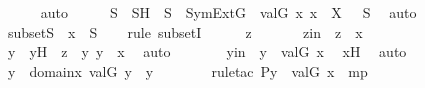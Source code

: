 \begin{isabellebody}
\ \ \ \ \isamarkupfalse%
\ auto\isanewline
\ \ \isamarkupfalse%
\ \isamarkupfalse%
\ S\ \ SH\ {\isacharcolon}{\kern0pt}\ {\isachardoublequoteopen}S\ {\isasymin}\ SymExt{\isacharparenleft}{\kern0pt}G{\isacharparenright}{\kern0pt}{\isachardoublequoteclose}\ {\isachardoublequoteopen}{\isacharbraceleft}{\kern0pt}\ val{\isacharparenleft}{\kern0pt}G{\isacharcomma}{\kern0pt}\ x{\isacharparenright}{\kern0pt}{\isachardot}{\kern0pt}\ x\ {\isasymin}\ X\ {\isacharbraceright}{\kern0pt}\ {\isasymsubseteq}\ S{\isachardoublequoteclose}\ \isamarkupfalse%
\ auto\isanewline
\ \ \isamarkupfalse%
\ subsetS\ {\isacharcolon}{\kern0pt}\ {\isachardoublequoteopen}{\isasymUnion}x\ {\isasymsubseteq}\ S{\isachardoublequoteclose}\ \isanewline
\ \ \isamarkupfalse%
{\isacharparenleft}{\kern0pt}rule\ subsetI{\isacharparenright}{\kern0pt}\isanewline
\ \ \ \ \isamarkupfalse%
\ z\ \isanewline
\ \ \ \ \isamarkupfalse%
\ zin\ {\isacharcolon}{\kern0pt}\ {\isachardoublequoteopen}z\ {\isasymin}\ {\isasymUnion}x{\isachardoublequoteclose}\ \isanewline
\ \ \ \ \isamarkupfalse%
\ \isamarkupfalse%
\ y\ \ yH\ {\isacharcolon}{\kern0pt}\ {\isachardoublequoteopen}z\ {\isasymin}\ y{\isachardoublequoteclose}\ {\isachardoublequoteopen}y\ {\isasymin}\ x{\isachardoublequoteclose}\ \isamarkupfalse%
\ auto\isanewline
\ \ \ \ \isamarkupfalse%
\ \isamarkupfalse%
\ yin\ {\isacharcolon}{\kern0pt}\ {\isachardoublequoteopen}y\ {\isasymin}\ val{\isacharparenleft}{\kern0pt}G{\isacharcomma}{\kern0pt}\ x{\isacharprime}{\kern0pt}{\isacharparenright}{\kern0pt}{\isachardoublequoteclose}\ \isamarkupfalse%
\ x{\isacharprime}{\kern0pt}H\ \isamarkupfalse%
\ auto\isanewline
\ \ \ \ \isamarkupfalse%
\ \isamarkupfalse%
\ {\isachardoublequoteopen}{\isasymexists}y{\isacharprime}{\kern0pt}\ {\isasymin}\ domain{\isacharparenleft}{\kern0pt}x{\isacharprime}{\kern0pt}{\isacharparenright}{\kern0pt}{\isachardot}{\kern0pt}\ val{\isacharparenleft}{\kern0pt}G{\isacharcomma}{\kern0pt}\ y{\isacharprime}{\kern0pt}{\isacharparenright}{\kern0pt}\ {\isacharequal}{\kern0pt}\ y{\isachardoublequoteclose}\ \isanewline
\ \ \ \ \ \ \isamarkupfalse%
{\isacharparenleft}{\kern0pt}rule{\isacharunderscore}{\kern0pt}tac\ P{\isacharequal}{\kern0pt}{\isachardoublequoteopen}y\ {\isasymin}\ val{\isacharparenleft}{\kern0pt}G{\isacharcomma}{\kern0pt}\ x{\isacharprime}{\kern0pt}{\isacharparenright}{\kern0pt}{\isachardoublequoteclose}\ \ mp{\isacharparenright}{\kern0pt}\isanewline

\end{isabellebody}
